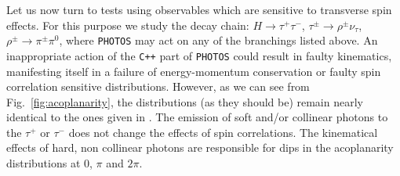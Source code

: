 \documentclass[]{Photos_interface_design}
\begin{document}
Let us now turn to tests using observables which are sensitive to
transverse spin effects.  For this purpose we study the decay chain:
$H\to \tau^+\tau^-$, $\tau^\pm \to \rho^\pm \nu_\tau$, $\rho^\pm \to
\pi^\pm \pi^0$, where {\tt PHOTOS} may act on any of the branchings
listed above. An inappropriate action of the {\tt C++} part of {\tt PHOTOS}
could result in faulty kinematics, manifesting itself in a failure of
energy-momentum conservation or faulty spin
correlation sensitive distributions. However, as we can see from Fig.~\ref{fig:acoplanarity},
 the distributions (as they should be) remain nearly identical to the ones given in
\cite{Davidson:2010rw,tauolaC++}. The emission of soft and/or
collinear photons to the $\tau^+$ or $\tau^-$ does not change the
effects of spin correlations. The kinematical effects of hard,
non collinear  photons are responsible for dips in 
the acoplanarity distributions at $0$, $\pi$ and $2\pi$.
\end{document}
